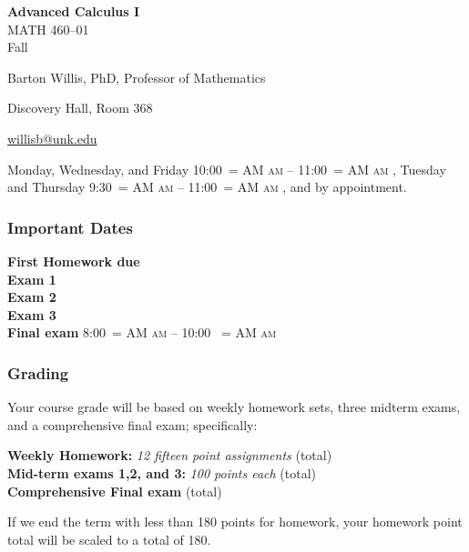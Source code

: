 \documentclass[12pt]{article}
\makeatletter
\newcounter{ex}\setcounter{ex}{0}
\newenvironment{mypar}[2]
  {\begin{list}{}%
    {\setlength\leftmargin{#1}
    \setlength\rightmargin{#2}}
    \item[]}
  {\end{list}}
\renewenvironment{description}[0]{\begin{compactdesc}}{\end{compactdesc}}
\DeclareRobustCommand{\maybefakesc}[1]{%
  \ifnum\pdfstrcmp{\f@series}{\bfdefault}=\z@
    {\fontsize{\dimexpr0.8\dimexpr\f@size pt\relax}{0}\selectfont\uppercase{#1}}%
  \else
    \textsc{#1}%
  \fi
}
\newcommand\AM{\,\maybefakesc{am}\xspace}
\newcommand{\coursename}{Advanced Calculus I}
\newcommand{\coursenumber}{MATH 460}
\newcommand{\sectionnumber}{01}
\newcommand{\term}{Fall }
\newcommand{\officehours}{ Monday, Wednesday, and Friday 10:00\AM -- 11:00\AM,
    Tuesday and Thursday 9:30\AM -- 11:00\AM, and by appointment.}
\newcommand{\finaldateandtime}{\printdate{14/12/\the\year} 8:00\AM{} -- 10:00 \AM}
\makeatother
\begin{document}
\cleanlookdateon%
\shortdate
\printyearoff
\large
\begin{center}
    \textbf{\coursename}  \\
    {\coursenumber--\sectionnumber} \\
     {\term \the\year} \\
\end{center}

\vskip0.25in
\normalsize


\begin{center}
\begin{description}
    \item[Instructor:] Barton Willis, PhD, Professor of Mathematics
    \item[Office:]  Discovery Hall, Room 368
    \item[\phone:]   
    \item[\Email:]    \href{mailto:willisb@unk.edu}{willisb@unk.edu}
    \item[Office Hours:] \officehours
  \end{description}
\end{center}



\subsubsection*{Important Dates}

\begin{mypar}{0.25in}{0.25in} 

      \textbf{First Homework due} \dotfill  {}  \\
       \textbf{Exam 1} \dotfill {}  \\
    \textbf{Exam 2} \dotfill  {} \\
    \textbf{Exam 3} \dotfill {} \\
      \textbf{Final exam} \dotfill  \finaldateandtime
\end{mypar}



\subsubsection*{Grading}

Your course grade will be based on weekly homework sets, three midterm exams, and a comprehensive 
final exam; specifically:
\begin{mypar}{0.25in}{0.25in}
    \textbf{Weekly Homework:}  \emph{12 fifteen point assignments}   (total) \\
    \textbf{Mid-term exams 1,2, and 3:} \emph{100 points each}  (total)\\
      \textbf{Comprehensive Final exam}  (total)
\end{mypar}
If we end the term with less than 180 points for homework,  your homework point total will be scaled to a total of 180. 
\end{document}
